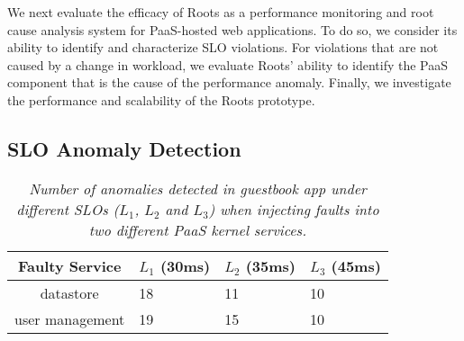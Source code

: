 We next evaluate the efficacy of Roots as a performance monitoring and root cause
analysis system for PaaS-hosted web applications.
To do so, we consider its ability to identify and characterize SLO violations.
For violations that are not caused by a change in workload, we evaluate Roots' ability to identify
the PaaS component that is the cause of the performance anomaly.
Finally, we investigate the performance and scalability of the Roots
prototype. 


\subsection{SLO Anomaly Detection}

\begin{table}
{\footnotesize
\begin{center}
\begin{tabular}{|c|p{1cm}|p{1cm}|p{1cm}|}
\hline
Faulty Service & $L_1$ (30ms) & $L_2$ (35ms) & $L_3$ (45ms) \\ \hline
datastore & 18 & 11 & 10 \\ \hline
user management & 19 & 15 & 10 \\ \hline
\end{tabular}
\end{center}
}
\caption{\textit{Number of anomalies detected in guestbook app under different SLOs 
($L_1$, $L_2$ and $L_3$) when injecting faults into two different PaaS kernel services.
\label{tab:anomaly_counts}
}}
\vspace{-0.2in}
\end{table}

